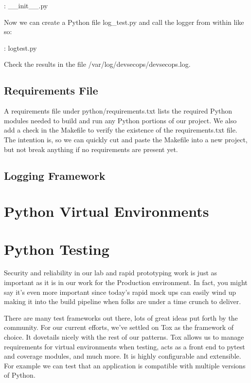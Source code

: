 \justifying
\begin{mybox}{\thetcbcounter: \_\_init\_\_.py}
  
\end{mybox}

\justifying
Now we can create a Python file log\_test.py and call the logger from within like so:

\begin{mybox}{\thetcbcounter: logtest.py}
  
\end{mybox}

\justifying
Check the results in the file /var/log/devsecops/devsecops.log.

\subsection{Requirements File}

\justifying
A requirements file under python/requirements.txt lists
the required Python modules needed to build and run any Python portions of our  project.
We also add a check in the Makefile to verify the existence of the requirements.txt file.
The intention is, so we can quickly cut and paste the Makefile into a new project, but
not break anything if no requirements are present yet.

\subsection{Logging Framework}

\section{Python Virtual Environments}

\section{Python Testing}

\justifying
Security and reliability in our lab and rapid prototyping work is just as important as it is in our work for the Production environment.
In fact, you might say it's even more important since today's rapid mock ups
can easily wind up making it into the build pipeline when folks are under a time crunch to deliver.

\justifying
There are many test frameworks out there, lots of great ideas put forth by the community. For our current
efforts, we've settled on Tox as the framework of choice. It dovetails nicely with the rest of
our patterns. Tox allows us to manage requirements for virtual environments when testing, acts as a front
end to pytest and coverage modules, and much more. It is highly configurable and extensible. For example
we can test that an application is compatible with multiple versions of Python.

